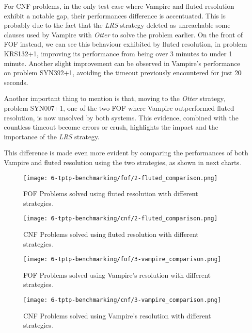 For CNF problems, in the only test case where Vampire and fluted resolution exhibit a notable gap, their performances difference is accentuated. This is probably due to the fact that the \emph{LRS} strategy deleted as unreachable some clauses used by Vampire with \emph{Otter} to solve the problem earlier.
On the front of FOF instead, we can see this behaviour exhibited by fluted resolution, in problem KRS132+1, improving its performance from being over 3 minutes to under 1 minute. Another slight improvement can be observed in Vampire's performance on problem SYN392+1, avoiding the timeout previously encountered for just 20 seconds.

Another important thing to mention is that, moving to the \emph{Otter} strategy, problem SYN007+1, one of the two FOF where Vampire outperformed fluted resolution, is now unsolved by both systems. This evidence, combined with the countless timeout become errors or crush, highlights the impact and the importance of the \emph{LRS} strategy.

This difference is made even more evident by comparing the performances of both Vampire and fluted resolution using the two strategies, as shown in next charts.

\begin{figure}[H]
  \centering
  \texttt{[image: 6-tptp-benchmarking/fof/2-fluted\_comparison.png]}
  \caption{FOF Problems solved using fluted resolution with different strategies.}\label{fig:fof-fluted}
\end{figure}

\begin{figure}[H]
  \centering
  \texttt{[image: 6-tptp-benchmarking/cnf/2-fluted\_comparison.png]}
  \caption{CNF Problems solved using fluted resolution with different strategies.}\label{fig:cnf-fluted}
\end{figure}
\begin{figure}[H]
  \centering
  \texttt{[image: 6-tptp-benchmarking/fof/3-vampire\_comparison.png]}
  \caption{FOF Problems solved using Vampire's resolution with different strategies.}\label{fig:fof-vampire}
\end{figure}

\begin{figure}[H]
  \centering
  \texttt{[image: 6-tptp-benchmarking/cnf/3-vampire\_comparison.png]}
  \caption{CNF Problems solved using Vampire's resolution with different strategies.}\label{fig:cnf-vampire}
\end{figure}

